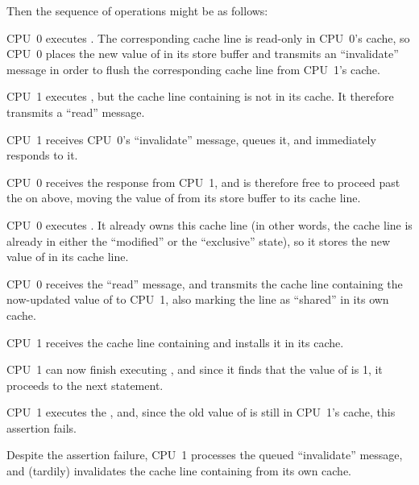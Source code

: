 Then the sequence of operations might be as follows:
\begin{fcvref}
\begin{sequence}
\item	CPU~0 executes .  The corresponding
	cache line is read-only in
	CPU~0's cache, so CPU~0 places the new value of  in its
	store buffer and transmits an ``invalidate'' message in order
	to flush the corresponding cache line from CPU~1's cache.
	\label{seq:app:whymb:Invalidate Queues and Memory Barriers}
\item	CPU~1 executes , but the cache line
	containing  is not in its cache.
	It therefore transmits a ``read'' message.
\item	CPU~1 receives CPU~0's ``invalidate'' message, queues it, and
	immediately responds to it.
\item	CPU~0 receives the response from CPU~1, and is therefore free
	to proceed past the  on  above, moving
	the value of  from its store buffer to its cache line.
\item	CPU~0 executes .
	It already owns this cache line (in other words, the cache line
	is already in either the ``modified'' or the ``exclusive'' state),
	so it stores the new value of  in its cache line.
\item	CPU~0 receives the ``read'' message, and transmits the
	cache line containing the now-updated value of 
	to CPU~1, also marking the line as ``shared'' in its own cache.
\item	CPU~1 receives the cache line containing  and installs
	it in its cache.
\item	CPU~1 can now finish executing ,
	and since it finds that the value of  is 1, it proceeds
	to the next statement.
\item	CPU~1 executes the , and, since the
	old value of  is still in CPU~1's cache,
	this assertion fails.
\item	Despite the assertion failure, CPU~1 processes the queued
	``invalidate'' message, and (tardily)
	invalidates the cache line containing  from its own cache.
\end{sequence}
\end{fcvref}

\QuickQuizEnd

